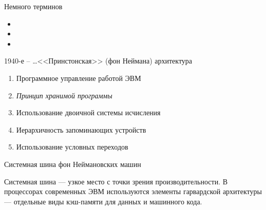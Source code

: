 \documentclass[xetex,aspectratio=43]{beamer}
\begin{document}
\begin{frame}{Немного терминов}
	\begin{itemize}
		\item
		\item
		\item
	\end{itemize}
\end{frame}

\begin{frame}{1940-е -- \ldots <<Принстонская>> (фон Неймана) архитектура}
	\begin{figure}
		
	\end{figure}

	\pause

	\begin{enumerate}
		\item
		Программное управление работой ЭВМ
		\item
		\em{Принцип хранимой программы}
		\item
		Использование двоичной системы исчисления
		\item
		Иерархичность запоминающих устройств
		\item
		Использование условных переходов
	\end{enumerate}
\end{frame}

\begin{frame}{Системная шина фон Неймановских машин}
		\begin{figure}
			
		\end{figure}

		\pause

		Системная шина --- узкое место с точки зрения производительности. В
		процессорах современных ЭВМ используются элементы гарвардской
		архитектуры --- отдельные виды кэш-памяти для данных и машинного кода.
\end{frame}
\end{document}

